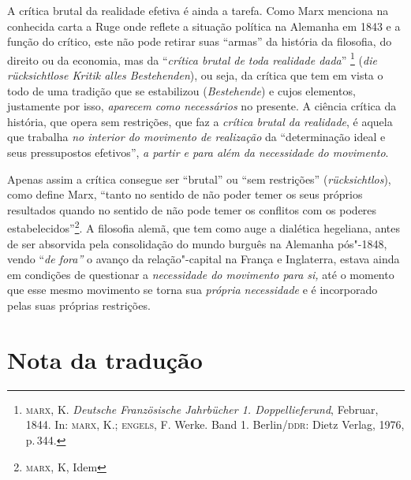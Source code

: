 A crítica brutal da realidade efetiva é ainda a tarefa. Como Marx
menciona na conhecida carta a Ruge onde reflete a situação política na
Alemanha em 1843 e a função do crítico, este não pode retirar suas
``armas'' da história da filosofia, do direito ou da economia, mas da
``\emph{crítica brutal de toda realidade dada}'' \footnote{\textsc{marx}, K.
  \emph{Deutsche Französische Jahrbücher 1. Doppellieferund}, Februar,
  1844. In: \textsc{marx}, K.; \textsc{engels}, F. Werke. Band 1. Berlin/\textsc{ddr}: Dietz
  Verlag, 1976, p.\,344.} (\emph{die rücksichtlose Kritik alles
Bestehenden}), ou seja, da crítica que tem em vista o todo de uma
tradição que se estabilizou (\emph{Bestehende}) e cujos elementos,
justamente por isso, \emph{aparecem como necessários} no presente. A
ciência crítica da história, que opera sem restrições, que faz a
\emph{crítica brutal da realidade}, é aquela que trabalha \emph{no
interior do movimento de realização} da ``determinação ideal e seus
pressupostos efetivos'', \emph{a partir e para além da necessidade do
movimento}.

Apenas assim a crítica consegue ser ``brutal'' ou ``sem restrições''
(\emph{rücksichtlos}), como define Marx, ``tanto no sentido de não poder
temer os seus próprios resultados quando no sentido de não pode temer os
conflitos com os poderes estabelecidos''\footnote{\textsc{marx}, K, Idem}. A
filosofia alemã, que tem como auge a dialética hegeliana, antes de ser
absorvida pela consolidação do mundo burguês na Alemanha pós"-1848, vendo
``\emph{de fora''} o avanço da relação"-capital na França e Inglaterra,
estava ainda em condições de questionar a \emph{necessidade do movimento
para si,} até o momento que esse mesmo movimento se torna sua
\emph{própria necessidade} e é incorporado pelas suas próprias
restrições.

\section*{Nota da tradução}

